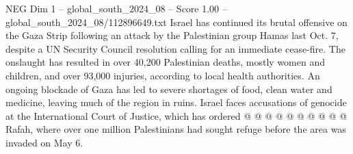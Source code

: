 \begin{textsample}{NEG Dim 1 – global\_south\_2024\_08 – Score 1.00 – global\_south\_2024\_08/112896649.txt}
Israel has continued its brutal offensive on the Gaza Strip following an attack by the Palestinian group Hamas last Oct. 7, despite a UN Security Council resolution calling for an immediate cease-fire.
The onslaught has resulted in over 40,200 Palestinian deaths, mostly women and children, and over 93,000 injuries, according to local health authorities.
An ongoing blockade of Gaza has led to severe shortages of food, clean water and medicine, leaving much of the region in ruins.
Israel faces accusations of genocide at the International Court of Justice, which has ordered @ @ @ @ @ @ @ @ @ @ Rafah, where over one million Palestinians had sought refuge before the area was invaded on May 6.

\end{textsample}

